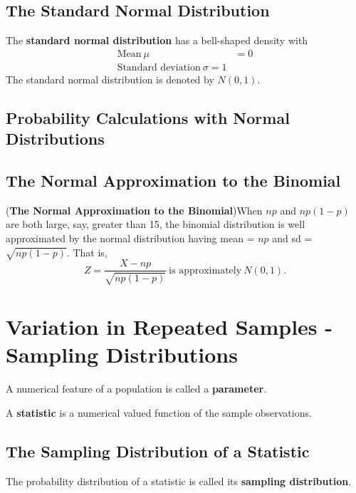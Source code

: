 \documentclass[12pt,a4paper]{article}
\begin{document}
\subsection{The Standard Normal Distribution}

\begin{tcolorbox}[colback=white]
	The \textbf{standard normal distribution} has a bell-shaped density with \begin{align*}
	\text{Mean}\ \mu &= 0 \\
	\text{Standard deviation}\ \sigma = 1
	\end{align*} The standard normal distribution is denoted by $N(0,1)$.
\end{tcolorbox}


\subsection{Probability Calculations with Normal Distributions}

\subsection{The Normal Approximation to the Binomial}

\begin{tcolorbox}[colback=white]
	(\textbf{The Normal Approximation to the Binomial})\quad When $np$ and $np(1-p)$ are both large, say, greater than 15, the binomial distribution is well approximated by the normal distribution having mean = $np$ and sd = $\sqrt{np(1-p)}$. That is, \[
	Z=\frac{X-np}{\sqrt{np(1-p)}}\ \text{is approximately}\ N(0,1).
	\]
\end{tcolorbox}


\section{Variation in Repeated Samples - Sampling Distributions}

\begin{tcolorbox}[colback=white]
	A numerical feature of a population is called a \textbf{parameter}.
\end{tcolorbox}
\begin{tcolorbox}[colback=white]
	A \textbf{statistic} is a numerical valued function of the sample observations.
\end{tcolorbox}

\subsection{The Sampling Distribution of a Statistic}
\begin{tcolorbox}[colback=white]
	The probability distribution of a statistic is called its \textbf{sampling distribution}.
\end{tcolorbox}
\end{document}

